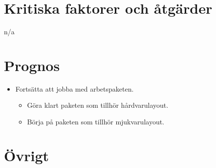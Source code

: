 \section{Kritiska faktorer och åtgärder}
n/a

\section{Prognos}	
\begin{itemize}[noitemsep]
    \item Fortsätta att jobba med arbetspaketen.
    \begin{itemize}
    	\item Göra klart paketen som tillhör hårdvarulayout.
    	\item Börja på paketen som tillhör mjukvarulayout.
    \end{itemize}
\end{itemize}

\section{Övrigt}

